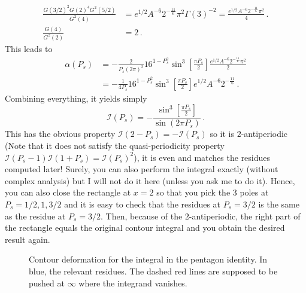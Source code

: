 \documentclass[11pt]{article}
\begin{document}
\begin{equation}
\begin{aligned}
    \frac{G(3/2)^2G(2)^4G^2(5/2)}{G^2(4)} &= e^{1/2}A^{-6}2^{-\frac{11}{6}}\pi^2 \Gamma(3)^{-2} = \frac{e^{1/2}A^{-6}2^{-\frac{11}{6}}\pi^2}{4}\,.\\
    \frac{G(4)}{G^2(2)}&= 2\,.
\end{aligned}
\end{equation}
This leads to 
\begin{equation}
\begin{aligned}
      \alpha(P_s) &=-\frac{2}{P_s(2\pi)^2}16^{1-P_s^2}\sin^3\left[\frac{\pi P_s}{2}\right]\frac{e^{1/2}A^{-6}2^{-\frac{11}{6}}\pi^2}{2}\\
      &=-\frac{1}{4P_s}16^{1-P_s^2}\sin^3\left[\frac{\pi P_s}{2}\right]e^{1/2}A^{-6}2^{-\frac{11}{6}}\,.
\end{aligned}
\end{equation}
Combining everything, it yields simply
\begin{equation}
    \mathcal{I}(P_s)= -\frac{\sin^3\left[\frac{\pi P_s}{2}\right]}{\sin(2\pi P_s)}\,.
\end{equation}
This has the obvious property $\mathcal{I}(2-P_s)=-\mathcal{I}(P_s)$ so it is $2$-antiperiodic (Note that it does not satisfy the quasi-periodicity property $\mathcal{I}(P_s-1)\mathcal{I}(1+P_s)=\mathcal{I}(P_s)^2$), it is even and matches the residues computed later! Surely, you can also perform the integral exactly (without complex analysis) but I will not do it here (unless you ask me to do it). Hence, you can also close the rectangle at $x=2$ so that you pick the 3 poles at $P_s = 1/2, 1, 3/2$ and it is easy to check that the residues at $P_s=3/2$ is the same as the residue at $P_s=3/2$. Then, because of the $2$-antiperiodic, the right part of the rectangle equals the original contour integral and you obtain the desired result again.
\begin{figure}[!t]
\centering
{}
\caption{Contour deformation for the integral in the pentagon identity. In blue, the relevant residues. The dashed red lines are supposed to be pushed at $\infty$ where the integrand vanishes.}
\label{fig:contourdeformation}
\end{figure}
\end{document}
